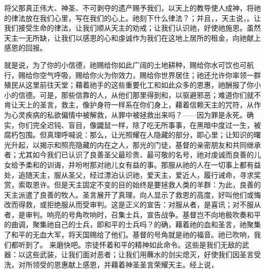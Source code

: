 \par

将父那真正伟大、神圣、不可剥夺的遗产赐予我们，以天上的教导使人成神，将祂的律法放在我们心里，写在我们的心上。祂刻下什么律法？；并且，，天主说，。让我们接受生命的律法，让我们顺从天主的劝戒；让我们认识祂，好使祂施恩。虽然天主一无所缺，让我们以感恩的心和虔诚作为我们在这地上居所的租金，向祂献上感恩的回报。\par

\par

就是说，为了你的小信德，祂赐给你如此广阔的土地耕种，赐给你水可饮也可航行，赐给你空气呼吸，赐给你火为你效力，赐给你世界居住；祂还允许你率领一群殖民从这里前往天堂；藉着祂手的这些重要化工和如此众多的恩惠，祂酬报了你小小的信德。可是，那些信靠的人，从他们那里得到和，以驱避邪恶；难道你们就不肯让天上的圣言，救主，像护身符一样系在你们身上，藉着信赖天主的咒符，从作为心灵疾病的私欲偏情中被解救，从罪中被拯救出来吗？——因为罪是永死。确实，你们完全迟钝、盲目，像鼹鼠一样，除了吃无所事事，在黑暗中度过一生，被腐朽包围。但真理呼喊说：那么，让光照耀在人隐藏的部分，即心里；让知识的曙光升起，以揭示和照亮隐藏的内在之人，那光的门徒，基督的亲密朋友和共同继承者；尤其如今我们已认识了良善圣父最珍贵、最可敬的名号，祂对虔诚而良善的儿女给予柔和的训诲，并吩咐那对祂儿女有益的事。那服从祂的人在一切事上都有益处，追随天主，服从圣父，经过漂泊认识祂，爱天主，爱近人，履行诫命，寻求奖赏，索取恩许。但是天主固定不变的目的始终是要拯救人类的羊群：为此，良善的天主派遣了良善的牧人。圣言展开了真理，向人显示了救恩的高度，好叫他们或悔改而得救，或拒绝服从而受审判。这是正义的宣告：对服从者，是喜讯；对不服从者，是审判。响亮的号角吹响时，召集士兵，宣告战争。基督岂不向地极吹奏和平的曲调，聚集祂自己的士兵，即和平的士兵吗？的确，藉着祂的血和圣言，祂聚集了和平的无血大军，将天国赐给了他们。基督的号角就是祂的福音。祂已吹响，我们都听到了。  来磨快吧。宗徒怀着和平的精神如此命令。这些是我们无敌的武器：以这些武装，让我们面对恶者；让我们用蘸水的剑尖熄灭，好使我们因圣言受洗，对所领受的恩惠献上感恩，并藉着神圣圣言荣耀天主。经上说， 